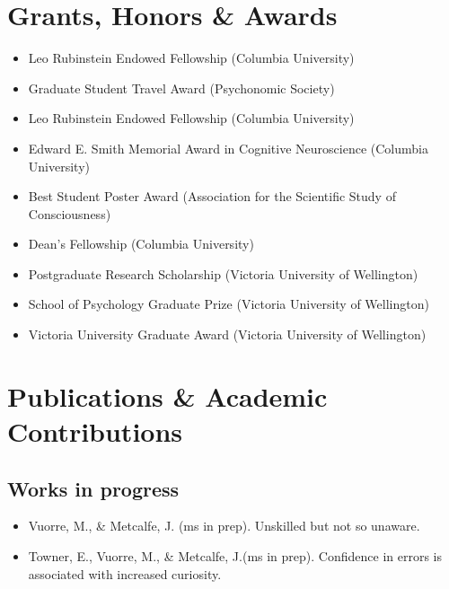 \documentclass[12pt, a4paper]{article}
\newcommand{\years}[1]{\marginnote{\scriptsize #1}}
\begin{document}
\section*{Grants, Honors \& Awards}
\begin{itemize}
\item \years{2016}Leo Rubinstein Endowed Fellowship (Columbia University)
\item Graduate Student Travel Award (Psychonomic Society)
\item \years{2015}Leo Rubinstein Endowed Fellowship (Columbia University)
\item Edward E. Smith Memorial Award in Cognitive Neuroscience (Columbia University)
\item Best Student Poster Award (Association for the Scientific Study of Consciousness)
\item \years{2013}Dean's Fellowship (Columbia University)
\item \years{2012}Postgraduate Research Scholarship (Victoria University of Wellington)
\item School of Psychology Graduate Prize (Victoria University of Wellington)
\item Victoria University Graduate Award (Victoria University of Wellington)
\end{itemize}

\section*{Publications \& Academic Contributions}
\subsection*{Works in progress}
\begin{itemize}
\item Vuorre, M., \& Metcalfe, J. (ms in prep). Unskilled but not so unaware.
\item Towner, E.\footnotemark[1], Vuorre, M.\footnotemark[1], \& Metcalfe, J.\footnotemark[1] (ms in prep). Confidence in errors is associated with increased curiosity.
\end{itemize}
\end{document}
